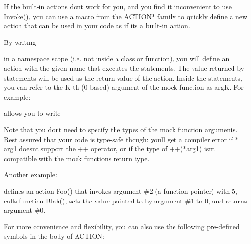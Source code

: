 If the built-\/in actions don\textquotesingle{}t work for you, and you find it inconvenient to use {\ttfamily Invoke()}, you can use a macro from the {\ttfamily A\+C\+T\+I\+O\+N$\ast$} family to quickly define a new action that can be used in your code as if it\textquotesingle{}s a built-\/in action.

By writing 
\begin{DoxyCode}{0}
\end{DoxyCode}
 in a namespace scope (i.\+e. not inside a class or function), you will define an action with the given name that executes the statements. The value returned by {\ttfamily statements} will be used as the return value of the action. Inside the statements, you can refer to the K-\/th (0-\/based) argument of the mock function as {\ttfamily argK}. For example\+: 
\begin{DoxyCode}{0}
\end{DoxyCode}
 allows you to write 
\begin{DoxyCode}{0}
\end{DoxyCode}


Note that you don\textquotesingle{}t need to specify the types of the mock function arguments. Rest assured that your code is type-\/safe though\+: you\textquotesingle{}ll get a compiler error if {\ttfamily $\ast$arg1} doesn\textquotesingle{}t support the {\ttfamily ++} operator, or if the type of {\ttfamily ++($\ast$arg1)} isn\textquotesingle{}t compatible with the mock function\textquotesingle{}s return type.

Another example\+: 
\begin{DoxyCode}{0}
\DoxyCodeLine{\}}
\end{DoxyCode}
 defines an action {\ttfamily Foo()} that invokes argument \#2 (a function pointer) with 5, calls function {\ttfamily Blah()}, sets the value pointed to by argument \#1 to 0, and returns argument \#0.

For more convenience and flexibility, you can also use the following pre-\/defined symbols in the body of {\ttfamily A\+C\+T\+I\+ON}\+:

